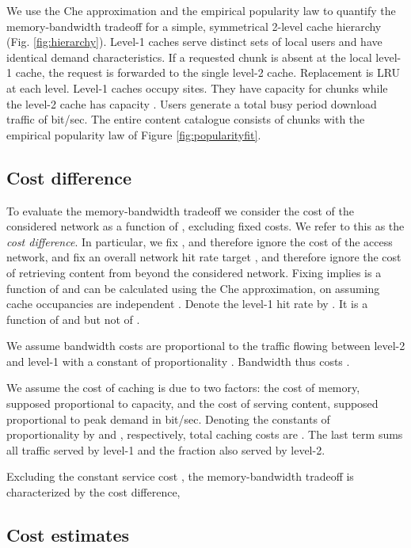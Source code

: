 \documentclass [11pt]{article}
\begin{document}
We use the Che approximation and the empirical popularity law to quantify the memory-bandwidth tradeoff for a simple, symmetrical 2-level cache hierarchy (Fig. \ref{fig:hierarchy}). Level-1 caches serve distinct sets of local users and have identical demand characteristics. If a requested chunk is absent at the local level-1 cache, the request is forwarded to the single level-2 cache. Replacement is LRU at each level. Level-1 caches occupy  sites. They have capacity for  chunks while the level-2 cache has capacity . Users generate a total busy period download traffic of  bit/sec. The entire content catalogue consists of  chunks with the empirical popularity law of Figure \ref{fig:popularityfit}.

\subsection{Cost difference}
To evaluate the memory-bandwidth tradeoff we consider the cost of the considered network as a function of , excluding fixed costs. We refer to this as the \emph{cost difference}. In particular, we fix , and therefore ignore the cost of the access network, and fix an overall network hit rate target  , and therefore ignore the cost of retrieving content from beyond the considered network. Fixing  implies  is a function of  and can be calculated using the Che approximation, on assuming cache occupancies are independent \cite{FRRS12}. Denote the level-1 hit rate by . It is a function of  and  but not of .

We assume bandwidth costs are proportional to the traffic flowing between level-2 and level-1 with a constant of proportionality . Bandwidth thus costs . 

We assume the cost of caching is due to two factors: the cost of memory, supposed proportional to capacity, and the cost of serving content, supposed proportional to peak demand in bit/sec. Denoting the constants of proportionality by  and , respectively, total caching costs are . The last  term sums all traffic served by level-1 and the fraction   also served by level-2.

Excluding the constant service cost , the memory-bandwidth tradeoff is characterized by the cost difference,




\subsection{Cost estimates}
\label{sec:costs}
\end{document}
